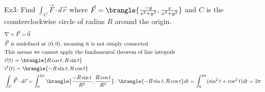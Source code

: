 Ex3: Find $\int_C\vec{F}\cdot d\vec{r}$ where $\vec{F}=\brangle{\frac{-y}{x^2+y^2},\frac{x}{x^2+y^2}}$ and $C$ is the counterclockwise circle of radius $R$ around the origin.
\begin{align*}
    &\nabla\times\vec{F}=\vec{0}\\
    &\text{$\vec{F}$ is undefined at $(0,0)$, meaning it is not simply connected}\\
    &\text{This means we cannot apply the fundamental theorem of line integrals}\\
    &\vec{r}(t)=\brangle{R\cos t,R\sin t}\\
    &\vec{r}'(t)=\brangle{-R\sin t,R\cos t}\\
    &\int_C\vec{F}\cdot d\vec{r}=\int_0^{2\pi}\brangle{\frac{-R\sin t}{R^2},\frac{R\cos t}{R^2}}\cdot\brangle{-R\sin t,R\cos t}dt=\int_0^{2\pi}(\sin^2t+\cos^2t)dt=2\pi
\end{align*}
